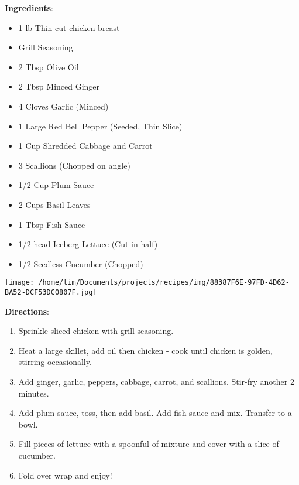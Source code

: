 \documentclass[11pt, twoside, openany]{book}
\begin{document}
\begin{minipage}[t]{0.8\linewidth}
\textbf{Ingredients}:\vspace{-3mm}
\begin{multicols}{2}
\begin{itemize}\setlength\itemsep{-1mm}
\item 1 lb Thin cut chicken breast
\item Grill Seasoning
\item 2 Tbsp Olive Oil
\item 2 Tbsp Minced Ginger
\item 4 Cloves Garlic (Minced)
\item 1 Large Red Bell Pepper (Seeded, Thin Slice)
\item 1 Cup Shredded Cabbage and Carrot
\item 3 Scallions (Chopped on angle)
\item 1/2 Cup Plum Sauce
\item 2 Cups Basil Leaves
\item 1 Tbsp Fish Sauce
\item 1/2 head Iceberg Lettuce (Cut in half)
\item 1/2 Seedless Cucumber (Chopped)
\end{itemize}
\end{multicols}
\end{minipage}
\begin{minipage}[t]{0.2\linewidth}
\centering \strut\vspace*{-\baselineskip}\newline
\texttt{[image: /home/tim/Documents/projects/recipes/img/88387F6E-97FD-4D62-BA52-DCF53DC0807F.jpg]}\\
\end{minipage}\vspace{3mm}
\textbf{Directions}:
\vspace{-3mm}\begin{enumerate}\setlength\itemsep{-1mm}
\item Sprinkle sliced chicken with grill seasoning.
\item Heat a large skillet, add oil then chicken - cook until chicken is golden, stirring occasionally.
\item Add ginger, garlic, peppers, cabbage, carrot, and scallions. Stir-fry another 2 minutes.
\item Add plum sauce, toss, then add basil. Add fish sauce and mix. Transfer to a bowl.
\item Fill pieces of lettuce with a spoonful of mixture and cover with a slice of cucumber.
\item Fold over wrap and enjoy!
\end{enumerate}
\end{document}
